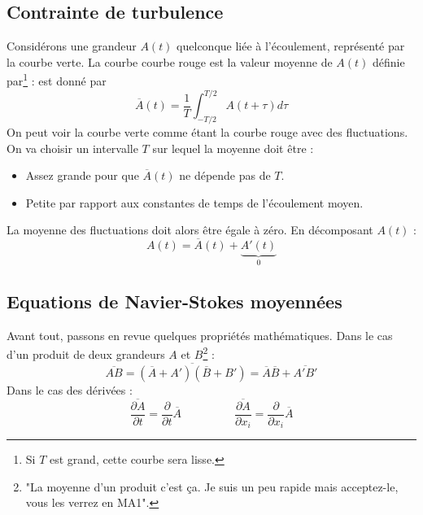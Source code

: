 	\subsection{Contrainte de turbulence}
	Considérons une grandeur $A(t)$ quelconque liée à l'écoulement, représenté par la courbe verte. 
	La courbe courbe rouge est la valeur moyenne de $A(t)$ définie par\footnote{Si $T$ est grand, 
	cette courbe sera lisse.} : 
	est donné par 
	\begin{equation}
	\overline{A}(t) = \frac{1}{T}\int_{-T/2}^{T/2} A(t+\tau)d\tau
	\end{equation}
	On peut voir la courbe verte comme étant la courbe rouge avec des fluctuations. On va choisir 
	un intervalle $T$ sur lequel la moyenne doit être :
	\begin{itemize}
	\item Assez grande pour que $\overline{A}(t)$ ne dépende pas de $T$.
	\item Petite par rapport aux constantes de temps de l'écoulement moyen.
	\end{itemize}
	La moyenne des fluctuations doit alors être égale à zéro. En décomposant $A(t)$ :
	\begin{equation}
	A(t) = \overline{A}(t) + \underbrace{A'(t)}_{0}
	\end{equation}
	
	
	
	\subsection{Equations de Navier-Stokes moyennées}
	Avant tout, passons en revue quelques propriétés mathématiques. Dans le cas d'un produit de deux 
	grandeurs $A$ et $B$\footnote{"La moyenne d'un produit c'est ça. Je suis un peu rapide mais 
	acceptez-le, vous les verrez en MA1".} :
	\begin{equation}
	\overline{AB} = \overline{(\overline{A}+A')(\overline{B}+B')} = \overline{A}\overline{B} + 
	\overline{A'B'}
	\end{equation}
	Dans le cas des dérivées :
	\begin{equation}
	\frac{\overline{\partial A}}{\partial t} = \frac{\partial}{\partial t}\overline{A}\ \ \ \ \ \ 
	\ \ \ \ \ \ \ \ \ \ \ \ \ \ \ \frac{\overline{\partial A}}{\partial x_i} = \frac{\partial}{
	\partial x_i}\overline{A}
	\end{equation}
	
